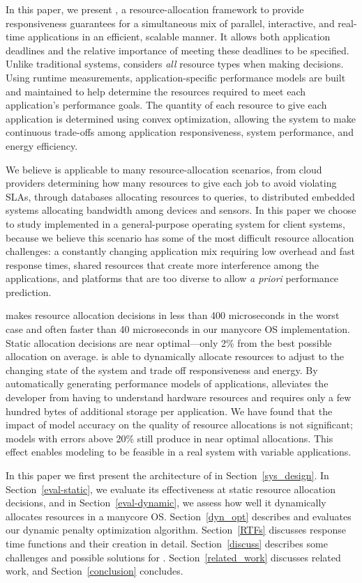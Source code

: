 In this paper, we present \pacora, a resource-allocation framework to
provide responsiveness guarantees for a simultaneous mix of parallel,
interactive, and real-time applications in an efficient, scalable
manner.  It allows both application deadlines and the relative
importance of meeting these deadlines to be specified.  Unlike
traditional systems, \pacora considers \emph{all} resource types when
making decisions.  Using runtime measurements, application-specific
performance models are built and maintained to help determine the
resources required to meet each application's performance goals.  The
quantity of each resource to give each application is determined using
convex optimization, allowing the system to make continuous trade-offs
among application responsiveness, system performance, and energy
efficiency.

We believe \pacora is applicable to many resource-allocation
scenarios, from cloud providers determining how many resources to give
each job to avoid violating SLAs, through databases allocating
resources to queries, to distributed embedded systems allocating
bandwidth among devices and sensors.  In this paper we choose to study
\pacora implemented in a general-purpose operating system for client
systems, because we believe this scenario has some of the most
difficult resource allocation challenges: a constantly changing
application mix requiring low overhead and fast response times, shared
resources that create more interference among the applications, and
platforms that are too diverse to allow \emph{a priori} performance
prediction.

\pacora makes resource allocation decisions in less than 400
microseconds in the worst case and often faster than 40 microseconds
in our manycore OS implementation.  Static allocation decisions are
near optimal---only 2\% from the best possible allocation on average.
\pacora is able to dynamically allocate resources to adjust to the
changing state of the system and trade off responsiveness and
energy. By automatically generating performance models of
applications, \pacora alleviates the developer from having to
understand hardware resources and requires only a few hundred bytes of
additional storage per application.  We have found that the impact of model accuracy on the quality of resource allocations is not significant; models with errors above 20\% still produce in near optimal allocations.  This effect enables modeling to be feasible in a real system with variable applications.

In this paper we first present the architecture of \pacora in Section~\ref{sys_design}.  In Section~\ref{eval-static}, we evaluate its effectiveness at static resource allocation decisions, and in Section~\ref{eval-dynamic}, we assess how well it dynamically allocates resources in a manycore OS.  Section~\ref{dyn_opt} describes and evaluates our dynamic penalty optimization algorithm. Section~\ref{RTFs} discusses response time functions and their creation in detail.  Section~\ref{discuss} describes some challenges and possible solutions for \pacora. Section~\ref{related_work} discusses related work, and Section~\ref{conclusion} concludes.
